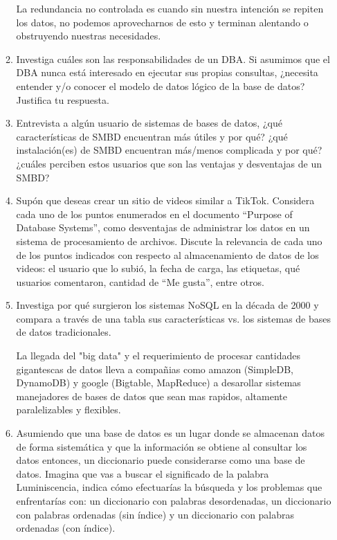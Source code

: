 \documentclass[11pt,letterpaper]{article}
\begin{document}
\begin{enumerate}
\begin{enumerate}
				La redundancia no controlada es cuando sin nuestra intención se repiten los datos,
				no podemos aprovecharnos de esto y terminan alentando o obstruyendo nuestras necesidades.

			\item Investiga cuáles son las responsabilidades de un DBA. Si asumimos que el DBA nunca está interesado
				en ejecutar sus propias consultas, ¿necesita entender y/o conocer el modelo de datos lógico de la
				base de datos? Justifica tu respuesta.

			\item Entrevista a algún usuario de sistemas de bases de datos, ¿qué características de SMBD encuentran
				más útiles y por qué? ¿qué instalación(es) de SMBD encuentran más/menos complicada y por qué?
				¿cuáles perciben estos usuarios que son las ventajas y desventajas de un SMBD?

			\item Supón que deseas crear un sitio de videos similar a TikTok. Considera cada uno de los puntos
				enumerados en el documento “Purpose of Database Systems”, como desventajas de administrar los
				datos en un sistema de procesamiento de archivos. Discute la relevancia de cada uno de los puntos
				indicados con respecto al almacenamiento de datos de los videos: el usuario que lo subió, la fecha de
				carga, las etiquetas, qué usuarios comentaron, cantidad de “Me gusta”, entre otros.

			\item Investiga por qué surgieron los sistemas NoSQL en la década de 2000 y compara a través de una tabla
				sus características vs. los sistemas de bases de datos tradicionales.

				La llegada del "big data" y el requerimiento de procesar cantidades gigantescas de datos lleva 
				a compañias como amazon (SimpleDB, DynamoDB) y google (Bigtable, MapReduce) a desarollar sistemas 
				manejadores de bases de datos que sean mas rapidos, altamente paralelizables y flexibles. 

			\item Asumiendo que una base de datos es un lugar donde se almacenan datos de forma sistemática y que
				la información se obtiene al consultar los datos entonces, un diccionario puede considerarse como una
				base de datos. Imagina que vas a buscar el significado de la palabra Luminiscencia, indica cómo
				efectuarías la búsqueda y los problemas que enfrentarías con: un diccionario con palabras
				desordenadas, un diccionario con palabras ordenadas (sin índice) y un diccionario con palabras
				ordenadas (con índice).


\end{enumerate}
\end{enumerate}
\end{document}
